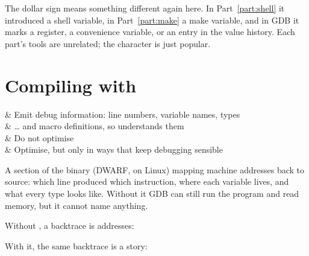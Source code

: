 \begin{note}
	The dollar sign means something different again here. In
	Part~\ref{part:shell} it introduced a shell variable, in
	Part~\ref{part:make} a make variable, and in GDB it marks a register, a
	convenience variable, or an entry in the value history. Each part's tools are
	unrelated; the character is just popular.
\end{note}

\section{Compiling with \texorpdfstring{}{-g}}\label{sec:gdb-g}


\begin{keys}[0.20]
	    & Emit debug information: line numbers, variable names, types  \\
	   & \dots{} and macro definitions, so  understands them \\
	   & Do not optimise                                              \\
	   & Optimise, but only in ways that keep debugging sensible      \\
\end{keys}

\begin{definition}
	A section of the binary (DWARF, on Linux) mapping machine addresses back to
	source: which line produced which instruction, where each variable lives, and
	what every type looks like. Without it GDB can still run the program and read
	memory, but it cannot name anything.
\end{definition}

Without , a backtrace is addresses:


With it, the same backtrace is a story:


